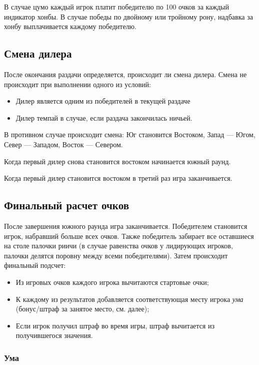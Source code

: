 В случае цумо каждый игрок платит победителю по 100 очков за каждый индикатор хонбы. В случае победы по двойному или тройному рону, надбавка за хонбу выплачивается каждому победителю.

\subsection{Смена дилера}

После окончания раздачи определяется, происходит ли смена дилера.
Смена не происходит при выполнении одного из условий:

\begin{itemize}
	\item Дилер является одним из победителей в текущей раздаче
	\item Дилер темпай в случае, если раздача закончилась ничьей.
\end{itemize}

В противном случае происходит смена: Юг становится Востоком, Запад --- Югом, Север --- Западом, Восток --- Севером.

Когда первый дилер снова становится востоком начинается южный раунд.

Когда первый дилер становится востоком в третий раз игра заканчивается.

\subsection{Финальный расчет очков}

После завершения южного раунда игра заканчивается. Победителем становится игрок, набравший больше всех очков. Также победитель забирает все оставшиеся на столе палочки риичи (в случае равенства очков у лидирующих игроков, палочки делятся поровну между всеми победителями).
Затем происходит финальный подсчет:

\begin{itemize}
	\item Из игровых очков каждого игрока вычитаются стартовые очки;
	\item К каждому из результатов добавляется соответствующая месту игрока \textit{ума} (бонус/штраф за занятое место, см. далее);
	\item Если игрок получил штраф во время игры, штраф вычитается из получившегося значения.
\end{itemize}

\subsubsection{Ума}

